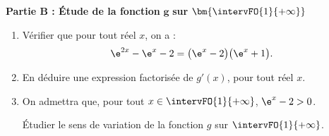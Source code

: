 \pagebreak

\textbf{Partie B : Étude de la fonction} $\bm{g}$ \textbf{sur} $\bm{{\intervFO{1}{+\infty}}}$

\begin{enumerate}
	\item Vérifier que pour tout réel $x$, on a : \[ \e^{2x}-\e^x-2=\big(\e^x-2\big)\big(\e^x+1\big). \]
	\item En déduire une expression factorisée de $g'(x)$, pour tout réel $x$.
	\item On admettra que, pour tout $x \in \intervFO{1}{+\infty}$, $\e^x-2 > 0$.
	
	Étudier le sens de variation de la fonction $g$ sur $\intervFO{1}{+\infty}$.
\end{enumerate}